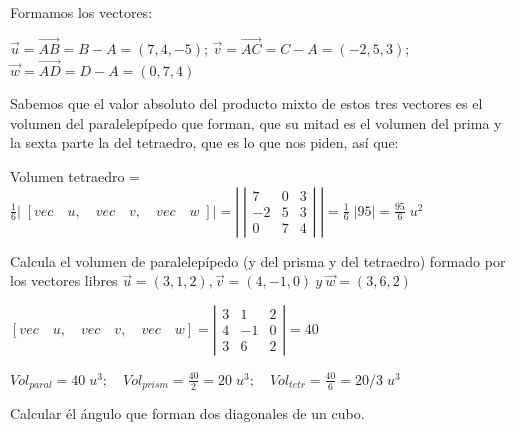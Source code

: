 \begin{proofw}\renewcommand{\qedsymbol}{$\diamond$}

Formamos los vectores:

$\vec u = \overrightarrow {AB}=B-A=(7,4,-5)$; 
$\vec v = \overrightarrow {AC}=C-A=(-2,5,3)$; 
$\vec w = \overrightarrow {AD}=D-A=(0,7,4)$

Sabemos que el valor absoluto del producto mixto de estos tres vectores es el volumen del paralelepípedo que forman, que su mitad es el volumen del prima y la sexta parte la del tetraedro, que es lo que nos piden, así que: 

Volumen tetraedro = $\frac 1 6 \left|\;  \left[ vec\quad u,\quad vec\quad v,\quad vec\quad w \; \right] \right|  =\left| \;  \left| \begin{matrix} 7 & 0 & 3 \\ -2 & 5 & 3 \\ 0 & 7 & 4 \end{matrix} \right|\;  \right| =\frac 1 6 \; |95|= \frac {95}{6} \; u^2$	
\end{proofw}


\begin{ejer}
	Calcula el volumen de paralelepípedo (y del prisma y del tetraedro) formado por los vectores libres $\vec u=(3,1,2), \vec v=(4,-1,0)\  y\  \vec w=(3,6,2)$
\end{ejer}

\begin{proofw}\renewcommand{\qedsymbol}{$\diamond$}
	
	$\left[ vec\quad u,\quad vec\quad v,\quad vec\quad w \right] =\left| \begin{matrix} 3 & 1 & 2 \\ 4 & -1 & 0 \\ 3 & 6 & 2 \end{matrix} \right| =40$
	
	$Vol_{paral}  = 40 \;  u^3; \quad  Vol_{prism} = \frac {40}2 =20\; u^3; \quad Vol_{tetr} = \frac {40}6 = 20/3 \; u^3$
	
\end{proofw}


\begin{ejer}
	Calcular él ángulo que forman dos diagonales de un cubo.
\end{ejer}


